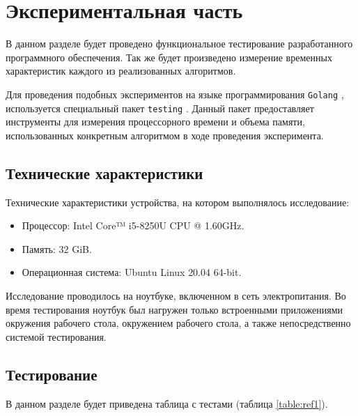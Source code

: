 \chapter{Экспериментальная часть}

В данном разделе будет проведено функциональное тестирование разработанного программного обеспечения. Так же будет произведено измерение временных характеристик каждого из реализованных алгоритмов. 

Для проведения подобных экспериментов на языке программирования \texttt{Golang} \cite{golang}, используется специальный пакет \texttt{testing} \cite{gotest}. Данный пакет предоставляет инструменты для измерения процессорного времени и объема памяти, использованных конкретным алгоритмом в ходе проведения 
эксперимента.

\section{Технические характеристики}

Технические характеристики устройства, на котором выполнялось исследование:

\begin{itemize}
	\item Процессор: Intel Core™ i5-8250U \cite{i5} CPU @ 1.60GHz.
	\item Память: 32 GiB.
	\item Операционная система: Ubuntu \cite{ubuntu} Linux \cite{linux} 20.04 64-bit.

\end{itemize}

Исследование проводилось на ноутбуке, включенном в сеть электропитания. Во время тестирования ноутбук был нагружен только встроенными приложениями окружения рабочего стола, окружением рабочего стола, а также непосредственно системой тестирования.

\section{Тестирование}

В данном разделе будет приведена таблица с тестами (таблица \ref{table:ref1}).

